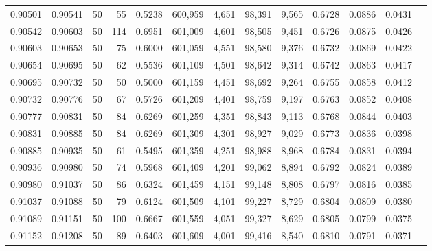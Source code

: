 \begin{tabular}{rrrrrrrrrrrrr}
0.90501 & 0.90541 &    50 &  55 &                                     0.5238 & 600,959 &   4,651 &  98,391 &   9,565 & 0.6728 & 0.0886 & 0.0431 \\
0.90542 & 0.90603 &    50 & 114 &                                     0.6951 & 601,009 &   4,601 &  98,505 &   9,451 & 0.6726 & 0.0875 & 0.0426 \\
0.90603 & 0.90653 &    50 &  75 &                                     0.6000 & 601,059 &   4,551 &  98,580 &   9,376 & 0.6732 & 0.0869 & 0.0422 \\
0.90654 & 0.90695 &    50 &  62 &                                     0.5536 & 601,109 &   4,501 &  98,642 &   9,314 & 0.6742 & 0.0863 & 0.0417 \\
0.90695 & 0.90732 &    50 &  50 &                                     0.5000 & 601,159 &   4,451 &  98,692 &   9,264 & 0.6755 & 0.0858 & 0.0412 \\
0.90732 & 0.90776 &    50 &  67 &                                     0.5726 & 601,209 &   4,401 &  98,759 &   9,197 & 0.6763 & 0.0852 & 0.0408 \\
0.90777 & 0.90831 &    50 &  84 &                                     0.6269 & 601,259 &   4,351 &  98,843 &   9,113 & 0.6768 & 0.0844 & 0.0403 \\
0.90831 & 0.90885 &    50 &  84 &                                     0.6269 & 601,309 &   4,301 &  98,927 &   9,029 & 0.6773 & 0.0836 & 0.0398 \\
0.90885 & 0.90935 &    50 &  61 &                                     0.5495 & 601,359 &   4,251 &  98,988 &   8,968 & 0.6784 & 0.0831 & 0.0394 \\
0.90936 & 0.90980 &    50 &  74 &                                     0.5968 & 601,409 &   4,201 &  99,062 &   8,894 & 0.6792 & 0.0824 & 0.0389 \\
0.90980 & 0.91037 &    50 &  86 &                                     0.6324 & 601,459 &   4,151 &  99,148 &   8,808 & 0.6797 & 0.0816 & 0.0385 \\
0.91037 & 0.91088 &    50 &  79 &                                     0.6124 & 601,509 &   4,101 &  99,227 &   8,729 & 0.6804 & 0.0809 & 0.0380 \\
0.91089 & 0.91151 &    50 & 100 &                                     0.6667 & 601,559 &   4,051 &  99,327 &   8,629 & 0.6805 & 0.0799 & 0.0375 \\
0.91152 & 0.91208 &    50 &  89 &                                     0.6403 & 601,609 &   4,001 &  99,416 &   8,540 & 0.6810 & 0.0791 & 0.0371 \\

\end{tabular}
